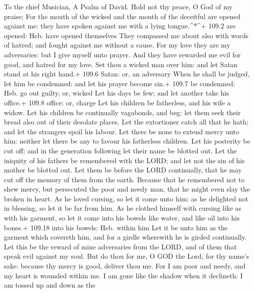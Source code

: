 To the chief Musician, A Psalm of David.  Hold not thy
peace, O God of my praise;  For the mouth of the wicked and
the mouth of the deceitful are opened against me: they have spoken
against me with a lying tongue.\^{}*\^{}+ 109.2 are opened: Heb. have
opened themselves  They compassed me about also with words
of hatred; and fought against me without a cause.  For my
love they are my adversaries: but I give myself unto prayer.
 And they have rewarded me evil for good, and hatred for my
love.  Set thou a wicked man over him: and let Satan stand
at his right hand.+ 109.6 Satan: or, an adversary  When he
shall be judged, let him be condemned: and let his prayer become sin.+
109.7 be condemned: Heb. go out guilty, or, wicked  Let his
days be few; and let another take his office.+ 109.8 office: or, charge
 Let his children be fatherless, and his wife a widow.
 Let his children be continually vagabonds, and beg: let
them seek their bread also out of their desolate places. 
Let the extortioner catch all that he hath; and let the strangers spoil
his labour.  Let there be none to extend mercy unto him:
neither let there be any to favour his fatherless children.
 Let his posterity be cut off; and in the generation
following let their name be blotted out.  Let the iniquity
of his fathers be remembered with the LORD; and let not the sin of his
mother be blotted out.  Let them be before the LORD
continually, that he may cut off the memory of them from the earth.
 Because that he remembered not to shew mercy, but
persecuted the poor and needy man, that he might even slay the broken in
heart.  As he loved cursing, so let it come unto him: as he
delighted not in blessing, so let it be far from him.  As
he clothed himself with cursing like as with his garment, so let it come
into his bowels like water, and like oil into his bones.+ 109.18 into
his bowels: Heb. within him  Let it be unto him as the
garment which covereth him, and for a girdle wherewith he is girded
continually.  Let this be the reward of mine adversaries
from the LORD, and of them that speak evil against my soul.
 But do thou for me, O GOD the Lord, for thy name's sake:
because thy mercy is good, deliver thou me.  For I am poor
and needy, and my heart is wounded within me.  I am gone
like the shadow when it declineth: I am tossed up and down as the
